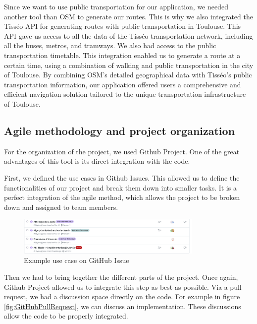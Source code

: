 Since we want to use public transportation for our application, we needed another tool than OSM to generate our routes. This is why we also integrated the Tisséo API for generating routes with public transportation in Toulouse. This API gave us access to all the data of the Tisséo transportation network, including all the buses, metros, and tramways. We also had access to the public transportation timetable. This integration enabled us to generate a route at a certain time, using a combination of walking and public transportation in the city of Toulouse. By combining OSM's detailed geographical data with Tisséo's public transportation information, our application offered users a comprehensive and efficient navigation solution tailored to the unique transportation infrastructure of Toulouse.


\subsection{Agile methodology and project organization}


For the organization of the project, we used Github Project. One of the great advantages of this tool is its direct integration with the code.


First, we defined the use cases in Github Issues. This allowed us to define the functionalities of our project and break them down into smaller tasks. It is a perfect integration of the agile method, which allows the project to be broken down and assigned to team members.


\begin{figure}[H]
    \centering
    \includegraphics[width=0.8\textwidth]{img/GitHubUseCase}
    \caption{Example use case on GitHub Issue}
    \label{fig:GitHubUseCase}
\end{figure}


Then we had to bring together the different parts of the project. Once again, Github Project allowed us to integrate this step as best as possible. Via a pull request, we had a discussion space directly on the code. For example in figure \ref{fig:GitHubPullRequest}, we can discuss an implementation. These discussions allow the code to be properly integrated.


